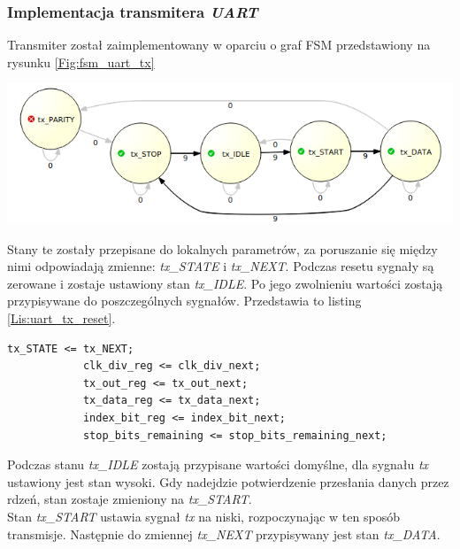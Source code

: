 \documentclass[11pt,a4paper]{article}
\begin{document}
	\subsubsection{Implementacja transmitera \textit{UART}}
	Transmiter został zaimplementowany w oparciu o graf FSM przedstawiony na rysunku \ref{Fig:fsm_uart_tx}\\
				\begin{minipage}[c]{\textwidth}

					\includegraphics[width=\textwidth]{./rysunki/uart_tx_fsm.png}
			\end{minipage}
		Stany te zostały przepisane do lokalnych parametrów, za poruszanie się między nimi odpowiadają zmienne: \textit{tx\_STATE} i \textit{tx\_NEXT}. Podczas resetu sygnały są zerowane i zostaje ustawiony stan \textit{tx\_IDLE}. Po jego zwolnieniu wartości zostają przypisywane do poszczególnych sygnałów. Przedstawia to listing \ref{Lis:uart_tx_reset}.\\
\begin{minipage}{\textwidth}
\begin{scriptsize}
\begin{lstlisting}[label=Lis:uart_tx_reset,caption=Transmiter \textit{UART} po resecie]
			tx_STATE <= tx_NEXT;
			clk_div_reg <= clk_div_next;
			tx_out_reg <= tx_out_next;
			tx_data_reg <= tx_data_next;
			index_bit_reg <= index_bit_next;
			stop_bits_remaining <= stop_bits_remaining_next;
\end{lstlisting}
\end{scriptsize}
\end{minipage}
Podczas stanu \textit{tx\_IDLE} zostają przypisane wartości domyślne, dla sygnału \textit{tx} ustawiony jest stan wysoki. Gdy nadejdzie potwierdzenie przesłania danych przez rdzeń, stan zostaje zmieniony na \textit{tx\_START}.\\
Stan \textit{tx\_START} ustawia sygnał \textit{tx} na niski, rozpoczynając w ten sposób transmisje. Następnie do zmiennej \textit{tx\_NEXT} przypisywany jest stan \textit{tx\_DATA}.\\
\end{document}
